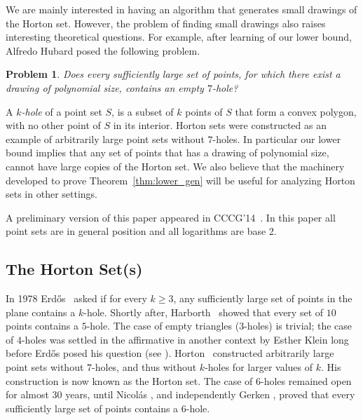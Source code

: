 \documentclass{article}
\newtheorem{problem}{Problem}
\begin{document}
We are mainly interested in having an algorithm that generates small drawings of the Horton set. 
However, the problem of finding small drawings 
also raises interesting theoretical questions. For example, after learning of our
lower bound, Alfredo Hubard posed the following problem.

\begin{problem}
Does every sufficiently large set of points, for which there exist a drawing of polynomial size, contains 
an empty $7$-hole?
\end{problem}

A \emph{$k$-hole} of a point set $S$, is a  subset of $k$ points of $S$ that form
a convex polygon, with no other point of $S$ in its interior. 
Horton sets were constructed as an example of arbitrarily large point sets without 
$7$-holes. In particular our lower bound implies that any set of points 
that has a drawing of polynomial size, cannot
have large copies of the Horton set.
We also believe that the machinery developed to prove Theorem~\ref{thm:lower_gen} will be
useful for analyzing Horton sets in other settings.

A preliminary version of this paper appeared in CCCG'14~\cite{HortonCCCG}. In this paper
all point sets are in general position and all logarithms are base 2.
\subsection{The Horton Set(s)}\label{sec:horton}

In 1978 Erd{\H o}s~\cite{somemore} asked if for every $k\ge 3$, 
any sufficiently large set of points in the plane
contains a $k$-hole. 
Shortly after, Harborth~\cite{harborth} showed that every set of $10$ points contains
a $5$-hole. The case of empty triangles ($3$-holes) is trivial;  
the case of $4$-holes was settled in the affirmative in another context
by Esther Klein long before Erd\H os posed his question (see \cite{happyend}).
Horton~\cite{hortonsets} constructed arbitrarily large point sets without $7$-holes,
and thus without $k$-holes for larger values of $k$. His construction is now known as
the Horton set. The case of $6$-holes remained open for almost 30 years, until
Nicol\'as \cite{nicolas}, and independently Gerken \cite{gerken}, proved
that every sufficiently large set of points contains a $6$-hole.
\end{document}
